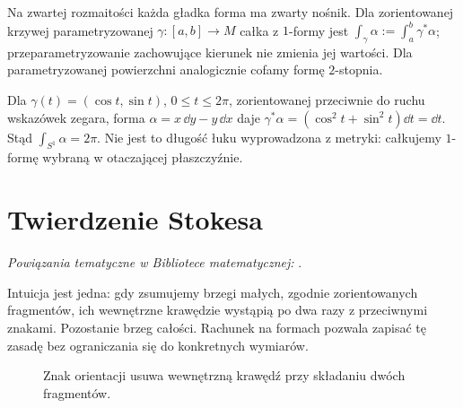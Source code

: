 Na zwartej rozmaitości każda gładka forma ma zwarty
nośnik. Dla zorientowanej krzywej parametryzowanej
$\gamma:[a,b]\to M$ całka z $1$-formy jest
$\int_\gamma\alpha:=\int_a^b\gamma^*\alpha$;
przeparametryzowanie zachowujące kierunek nie zmienia
jej wartości. Dla parametryzowanej powierzchni
analogicznie cofamy formę $2$-stopnia.

\begin{przyklad}
Dla $\gamma(t)=(\cos t,\sin t)$, $0\leq t\leq2\pi$,
zorientowanej przeciwnie do ruchu wskazówek zegara,
forma $\alpha=x\,\dd y-y\,\dd x$ daje
$\gamma^*\alpha=(\cos^2t+\sin^2t)\dd t=\dd t$.
Stąd $\int_{S^1}\alpha=2\pi$.
Nie jest to długość łuku wyprowadzona z metryki:
całkujemy $1$-formę wybraną w otaczającej płaszczyźnie.
\end{przyklad}

\section{Twierdzenie Stokesa}
\label{sec:formy-stokes}

\noindent\emph{Powiązania tematyczne w Bibliotece matematycznej:} .


Intuicja jest jedna: gdy zsumujemy brzegi
małych, zgodnie zorientowanych fragmentów,
ich wewnętrzne krawędzie wystąpią po dwa razy
z przeciwnymi znakami. Pozostanie brzeg całości.
Rachunek na formach pozwala zapisać tę zasadę
bez ograniczania się do konkretnych wymiarów.

\begin{figure}[!htbp]
\centering
{}
\caption{Znak orientacji usuwa wewnętrzną krawędź
przy składaniu dwóch fragmentów.}
\label{fig:stokes-anulowanie}
\end{figure}

